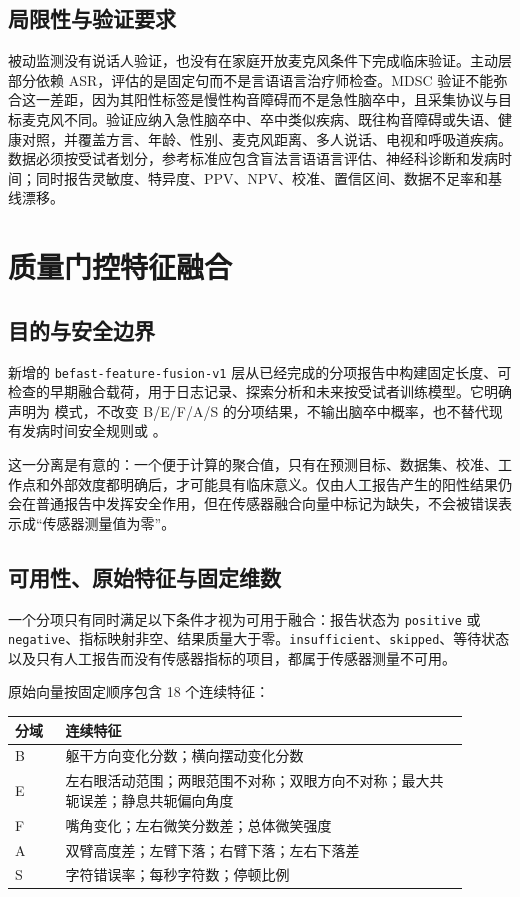 \documentclass[11pt,a4paper]{article}
\begin{document}
\subsection{局限性与验证要求}

被动监测没有说话人验证，也没有在家庭开放麦克风条件下完成临床验证。主动层部分依赖 ASR，评估的是固定句而不是言语语言治疗师检查。MDSC 验证不能弥合这一差距，因为其阳性标签是慢性构音障碍而不是急性脑卒中，且采集协议与目标麦克风不同。验证应纳入急性脑卒中、卒中类似疾病、既往构音障碍或失语、健康对照，并覆盖方言、年龄、性别、麦克风距离、多人说话、电视和呼吸道疾病。数据必须按受试者划分，参考标准应包含盲法言语语言评估、神经科诊断和发病时间；同时报告灵敏度、特异度、PPV、NPV、校准、置信区间、数据不足率和基线漂移。

\section{质量门控特征融合}

\subsection{目的与安全边界}

新增的 \texttt{befast-feature-fusion-v1} 层从已经完成的分项报告中构建固定长度、可检查的早期融合载荷，用于日志记录、探索分析和未来按受试者训练模型。它明确声明为  模式，不改变 B/E/F/A/S 的分项结果，不输出脑卒中概率，也不替代现有发病时间安全规则或 。

这一分离是有意的：一个便于计算的聚合值，只有在预测目标、数据集、校准、工作点和外部效度都明确后，才可能具有临床意义。仅由人工报告产生的阳性结果仍会在普通报告中发挥安全作用，但在传感器融合向量中标记为缺失，不会被错误表示成“传感器测量值为零”。

\subsection{可用性、原始特征与固定维数}

一个分项只有同时满足以下条件才视为可用于融合：报告状态为 \texttt{positive} 或 \texttt{negative}、指标映射非空、结果质量大于零。\texttt{insufficient}、\texttt{skipped}、等待状态以及只有人工报告而没有传感器指标的项目，都属于传感器测量不可用。

原始向量按固定顺序包含 18 个连续特征：

\begin{longtable}{p{0.10\linewidth}p{0.80\linewidth}}
\toprule
分域 & 连续特征 \\
\midrule
B & 躯干方向变化分数；横向摆动变化分数 \\
E & 左右眼活动范围；两眼范围不对称；双眼方向不对称；最大共轭误差；静息共轭偏向角度 \\
F & 嘴角变化；左右微笑分数差；总体微笑强度 \\
A & 双臂高度差；左臂下落；右臂下落；左右下落差 \\
S & 字符错误率；每秒字符数；停顿比例 \\
\bottomrule
\end{longtable}
\end{document}
